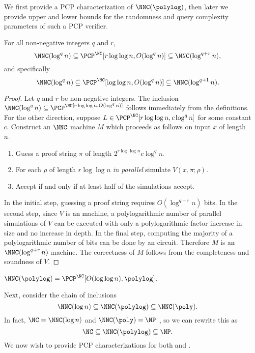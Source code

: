 \documentclass{article}
\newcommand{\loglog}{\log \log}
\begin{document}
We first provide a PCP characterization of $\NNC(\polylog)$, then later we provide upper and lower bounds for the randomness and query complexity parameters of such a PCP verifier.

\begin{theorem}\label{thm:qplusr}
  For all non-negative integers $q$ and $r$,
  \begin{equation*}
    \NNC(\log^q n) \subseteq \PCP^{\NC}[r \loglog n, O(\log^q n)] \subseteq \NNC(\log^{q + r} n),
  \end{equation*}
  and specifically
  \begin{equation*}
    \NNC(\log^q n) \subseteq \PCP^{\NC}[\loglog n, O(\log^q n)] \subseteq \NNC(\log^{q + 1} n).
  \end{equation*}
\end{theorem}
\begin{proof}
  Let $q$ and $r$ be non-negative integers.
  The inclusion $\NNC(\log^q n) \subseteq \PCP^\NC[r \loglog n, O(\log^q n)]$ follows immediately from the definitions.
  For the other direction, suppose $L \in \PCP^{\NC}[r \loglog n, c \log^q n]$ for some constant $c$.
  Construct an $\NNC$ machine $M$ which proceeds as follows on input $x$ of length $n$.
  \begin{enumerate}
  \item Guess a proof string $\pi$ of length $2^{r \loglog n} c \log^q n$.
  \item For each $\rho$ of length $r \loglog n$ \emph{in parallel} simulate $V(x, \pi; \rho)$.
  \item Accept if and only if at least half of the simulations accept.
  \end{enumerate}
In the initial step, guessing a proof string requires $O(\log^{q + r} n)$ bits.
In the second step, since $V$ is an \NC{} machine, a polylogarithmic number of parallel simulations of $V$ can be executed with only a polylogarithmic factor increase in size and no increase in depth.
In the final step, computing the majority of a polylogarithmic number of bits can be done by an \NC{} circuit.
Therefore $M$ is an $\NNC(\log^{q + r} n)$ machine.
The correctness of $M$ follows from the completeness and soundness of $V$.
\end{proof}

\begin{corollary}\label{cor:polylogeq}
  $\NNC(\polylog) = \PCP^{\NC}[O(\loglog n), \polylog]$.
\end{corollary}

Next, consider the chain of inclusions
\begin{equation*}
  \NNC(\log n) \subseteq \NNC(\polylog) \subseteq \NNC(\poly).
\end{equation*}
In fact, $\NC = \NNC(\log n)$ and $\NNC(\poly) = \NP$ \cite{wolf94}, so we can rewrite this as
\begin{equation}\label{eq:chain}
  \NC \subseteq \NNC(\polylog) \subseteq \NP.
\end{equation}
We now wish to provide \NC{} PCP characterizations for both \NC{} and \NP.
\end{document}
